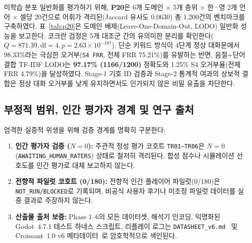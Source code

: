 미학습 분포 일반화를 평가하기 위해, \textbf{P20}은 6개 도메인 $\times$ 5개 층위 $\times$ 한·영 2개 언어 $\times$ 셀당 20건으로 어휘가 격리된(Jaccard 유사도 0.0630) 총 1,200건의 벤치마크를 구축하였다. 표~\ref{tab:p20}은 도메인 배제(Leave-One-Domain-Out, LODO) 일반화 성능을 보고한다. 코크란 검정은 5개 대조군 간의 유의미한 분리를 확인한다($Q = 871.39, \text{df}=4, p = 2.63 \times 10^{-187}$). 단순 키워드 방식이 4단계 정상 대화문에서 98.33\%라는 극심한 오거부(\texttt{S4 FRR}, 전체 FRR 75.21\%)를 유발하는 반면, 음절+단어 결합 TF-IDF LODO는 \textbf{97.17\% (1166/1200)} 정확도와 1.25\% S4 오거부율(전체 FRR 4.79\%)을 달성하였다. Stage-1 기호 ID 검증과 Stage-2 통계적 여과의 상보적 결합은 정상 대화 오거부를 낮게 유지하면서도 인가되지 않은 비밀 유출을 차단한다.

\subsection{부정적 범위, 인간 평가자 경계 및 연구 출처}\label{sec:kbs-scope}
엄격한 실증적 위생을 위해 검증 경계를 명확히 구분한다:
\begin{enumerate}
\item \textbf{인간 평가자 검증 ($N{=}0$):} 주관적 정성 평가 코호트 \texttt{TR01--TR06}은 $N{=}0$ (\texttt{AWAITING\_HUMAN\_RATERS}) 상태로 철저히 격리된다. 합성 점수나 시뮬레이션 선호도를 인간 평가로 대체 보고하지 않는다.
\item \textbf{전향적 파일럿 코호트 (0/180):} 전향적 인간 플레이어 파일럿(0/180)은 \texttt{NOT\_RUN/BLOCKED}로 기록되며, 비공식 사용자 후기나 미조정 파일럿 데이터를 실증 결과로 주장하지 않는다.
\item \textbf{산출물 출처 보증:} Phase 1--6의 모든 데이터셋, 해석기 인코딩, 익명화된 Godot~4.7.1 테스트 하네스 스크립트, 리플레이 로그는 \texttt{DATASHEET\_v6.md}~\cite{gebru2021datasheets} 및 Croissant~1.0 v6 메타데이터~\cite{akhtar2024croissant}로 암호학적으로 색인된다.
\end{enumerate}
